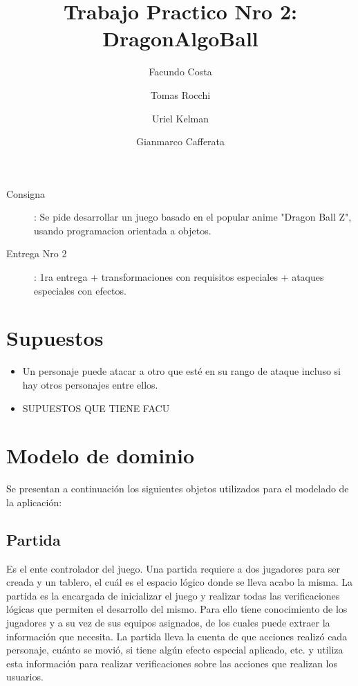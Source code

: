 \documentclass[a4paper]{article}
\title{Trabajo Practico Nro 2: DragonAlgoBall}
\author{ Facundo Costa \and Tomas Rocchi\and Uriel Kelman \and Gianmarco Cafferata}
\begin{document}
\maketitle

\begin{description}

\item [Consigna]: Se pide desarrollar un juego basado en el popular anime "Dragon Ball Z", usando programacion orientada a objetos.

\item [Entrega Nro 2]: 1ra entrega + transformaciones con requisitos especiales + ataques especiales con efectos.

\end{description}




\newpage
\section{Supuestos}

\begin{itemize}

\item Un personaje puede atacar a otro que esté en su rango de ataque incluso si hay otros personajes entre ellos.
\item SUPUESTOS QUE TIENE FACU

\end{itemize}




\section{Modelo de dominio}

Se presentan a continuación los siguientes objetos utilizados para el modelado de la aplicación: 

\subsection{Partida} Es el ente controlador del juego. Una partida requiere a dos jugadores para ser creada y un tablero, el cuál es el espacio lógico donde se lleva acabo la misma. La partida es la encargada de inicializar el juego y realizar todas las verificaciones lógicas que permiten el desarrollo del mismo. Para ello tiene conocimiento de los jugadores y a su vez de sus equipos asignados, de los cuales puede extraer la información que necesita. La partida  lleva la cuenta de que acciones realizó cada personaje, cuánto se movió, si tiene algún efecto especial aplicado, etc. y utiliza esta información para realizar verificaciones sobre las acciones que realizan los usuarios.
\end{document}
